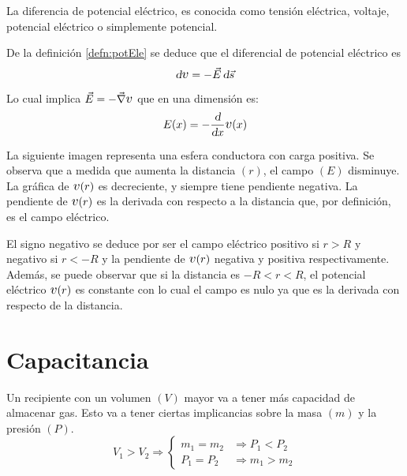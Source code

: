 \documentclass[a5paper,12pt,twoside]{book}
\begin{document}
La diferencia de potencial eléctrico, es conocida como tensión eléctrica, voltaje, potencial eléctrico o simplemente potencial.

De la definición \ref{defn:potEle} se deduce que el diferencial de potencial eléctrico es
\begin{equation*}
    \dif \voltage = - \Vec{E} \, \dif \Vec{s}
\end{equation*}

Lo cual implica $\Vec{E} = - \grad \voltage$ que en una dimensión es:
\begin{equation*}
    E(x) = - \frac{\dif}{\dif x} \voltage(x)
\end{equation*}

La siguiente imagen representa una esfera conductora con carga positiva.
Se observa que a medida que aumenta la distancia $(r)$, el campo $(E)$ disminuye.
La gráfica de $\voltage(r)$ es decreciente, y siempre tiene pendiente negativa.
La pendiente de $\voltage(r)$ es la derivada con respecto a la distancia que, por definición, es el campo eléctrico.

\begin{center}
    \def\svgwidth{0.8\linewidth}
    
\end{center}

El signo negativo se deduce por ser el campo eléctrico positivo si $r > R$ y negativo si $r < -R$ y la pendiente de $\voltage(r)$ negativa y positiva respectivamente.
Además, se puede observar que si la distancia es $-R < r < R$, el potencial eléctrico $\voltage(r)$ es constante con lo cual el campo es nulo ya que es la derivada con respecto de la distancia.


\section{Capacitancia}

Un recipiente con un volumen $(V)$ mayor va a tener más capacidad de almacenar gas.
Esto va a tener ciertas implicancias sobre la masa $(m)$ y la presión $(P)$.
\begin{equation*}
    V_1 > V_2 \Rightarrow
    \left\{
    \begin{aligned}
        m_1 = m_2 & \Rightarrow P_1 < P_2
        \\
        P_1 = P_2 & \Rightarrow m_1 > m_2
    \end{aligned}
    \right.
\end{equation*}
\end{document}
